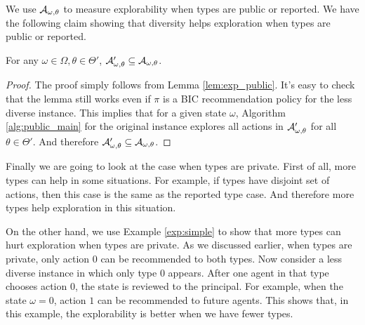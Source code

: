 We use $\mathcal{A}_{\omega,\theta}$ to measure explorability when types are public or reported. We have the following claim showing that diversity helps exploration when types are public or reported.

\begin{claim}
For any $\omega \in \varOmega, \theta \in \varTheta'$, $\mathcal{A}'_{\omega,\theta} \subseteq \mathcal{A}_{\omega,\theta}$.
\end{claim}

\begin{proof}
The proof simply follows from Lemma \ref{lem:exp_public}. It's easy to check that the lemma still works even if $\pi$ is a BIC recommendation policy for the less diverse instance. This implies that for a given state $\omega$, Algorithm \ref{alg:public_main} for the original instance explores all actions in $\mathcal{A}'_{\omega,\theta}$ for all $\theta \in \varTheta'$. And therefore $\mathcal{A}'_{\omega,\theta} \subseteq \mathcal{A}_{\omega,\theta}$.
\end{proof}

Finally we are going to look at the case when types are private. First of all, more types can help in some situations. For example, if types have disjoint set of actions, then this case is the same as the reported type case. And therefore more types help exploration in this situation.

On the other hand, we use Example \ref{exp:simple} to show that more types can hurt exploration when types are private. As we discussed earlier, when types are private, only action 0 can be recommended to both types. Now consider a less diverse instance in which only type 0 appears. After one agent in that type chooses action 0, the state is reviewed to the principal. For example, when the state $\omega = 0$, action $1$ can be recommended to future agents. This shows that,  in this example, the explorability is better when we have fewer types. 